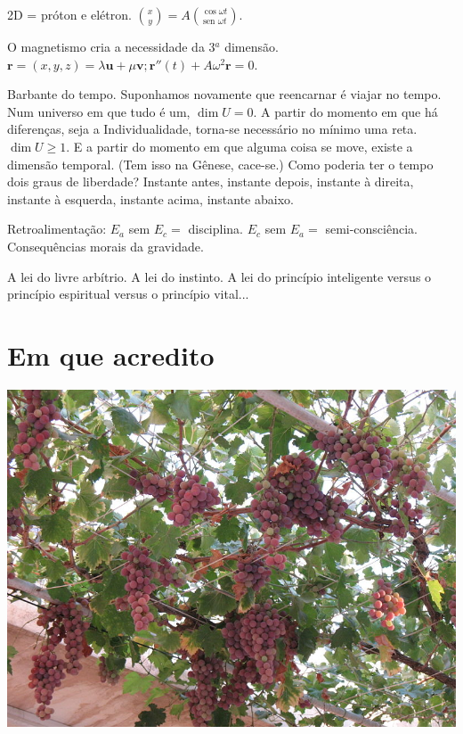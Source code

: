 \documentclass[12pt,a4paper]{article}
\begin{document}
		2D = pr\'oton e el\'etron. $\binom{x}{y} = A \binom{\cos \omega t}{\mbox{sen } \omega t}$.

		O magnetismo cria a necessidade da 3$^a$ dimens\~ao. $\mathbf{r} = (x,y,z) = \lambda \mathbf{u} + \mu \mathbf{v}; \mathbf{r}''(t) + A \omega^2 \mathbf{r} = 0$.

		Barbante do tempo. Suponhamos novamente que reencarnar \'e viajar no tempo. Num universo em que tudo \'e um, $\dim U = 0$. A partir do momento em que h\'a diferen\c{c}as, seja a Individualidade, torna-se necess\'ario no m\'inimo uma reta. $\dim U \ge 1$. E a partir do momento em que alguma coisa se move, existe a dimens\~ao temporal. (Tem isso na G\^enese, cace-se.) Como poderia ter o tempo dois graus de liberdade? Instante antes, instante depois, instante \`a direita, instante \`a esquerda, instante acima, instante abaixo.

		\begin{flushright}
		\end{flushright}

		Retroalimenta\c{c}\~ao: $E_a$ sem $E_c =$ disciplina. $E_c$ sem $E_a =$ semi-consci\^encia. Consequ\^encias morais da gravidade.

		\begin{flushright}
		\end{flushright}

		A lei do livre arb\'itrio. A lei do instinto. A lei do princ\'ipio inteligente versus o princ\'ipio espiritual versus o princ\'ipio vital...

	\section{Em que acredito}
			\begin{flushright}
			\end{flushright}

		\begin{center}
		\includegraphics{vitis_vinifera}
		\end{center}
\end{document}
